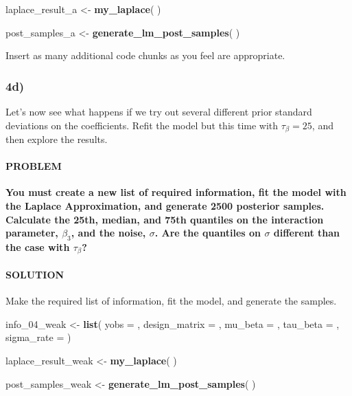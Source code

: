 \documentclass[
]{article}
\newenvironment{Shaded}{\begin{snugshade}}{\end{snugshade}}
\newcommand{\DataTypeTok}[1]{\textcolor[rgb]{0.13,0.29,0.53}{#1}}
\newcommand{\DecValTok}[1]{\textcolor[rgb]{0.00,0.00,0.81}{#1}}
\newcommand{\KeywordTok}[1]{\textcolor[rgb]{0.13,0.29,0.53}{\textbf{#1}}}
\newcommand{\NormalTok}[1]{#1}
\newcommand{\StringTok}[1]{\textcolor[rgb]{0.31,0.60,0.02}{#1}}
\begin{document}
\begin{Shaded}
\begin{Highlighting}[]
\NormalTok{laplace_result_a <-}\StringTok{ }\KeywordTok{my_laplace}\NormalTok{( )}

\NormalTok{post_samples_a <-}\StringTok{ }\KeywordTok{generate_lm_post_samples}\NormalTok{( )}
\end{Highlighting}
\end{Shaded}

Insert as many additional code chunks as you feel are appropriate.

\hypertarget{d-3}{%
\subsubsection{4d)}\label{d-3}}

Let's now see what happens if we try out several different prior
standard deviations on the coefficients. Refit the model but this time
with \(\tau_{\beta}=25\), and then explore the results.

\hypertarget{problem-21}{%
\paragraph{PROBLEM}\label{problem-21}}

\textbf{You must create a new list of required information, fit the
model with the Laplace Approximation, and generate 2500 posterior
samples. Calculate the 25th, median, and 75th quantiles on the
interaction parameter, \(\beta_3\), and the noise, \(\sigma\). Are the
quantiles on \(\sigma\) different than the case with \(\tau_{\beta}\)?}

\hypertarget{solution-20}{%
\paragraph{SOLUTION}\label{solution-20}}

Make the required list of information, fit the model, and generate the
samples.

\begin{Shaded}
\begin{Highlighting}[]
\NormalTok{info_}\DecValTok{04}\NormalTok{_weak <-}\StringTok{ }\KeywordTok{list}\NormalTok{(}
  \DataTypeTok{yobs =}\NormalTok{ ,}
  \DataTypeTok{design_matrix =}\NormalTok{ ,}
  \DataTypeTok{mu_beta =}\NormalTok{ ,}
  \DataTypeTok{tau_beta =}\NormalTok{ ,}
  \DataTypeTok{sigma_rate =} 
\NormalTok{)}

\NormalTok{laplace_result_weak <-}\StringTok{ }\KeywordTok{my_laplace}\NormalTok{( )}

\NormalTok{post_samples_weak <-}\StringTok{ }\KeywordTok{generate_lm_post_samples}\NormalTok{( )}
\end{Highlighting}
\end{Shaded}
\end{document}
